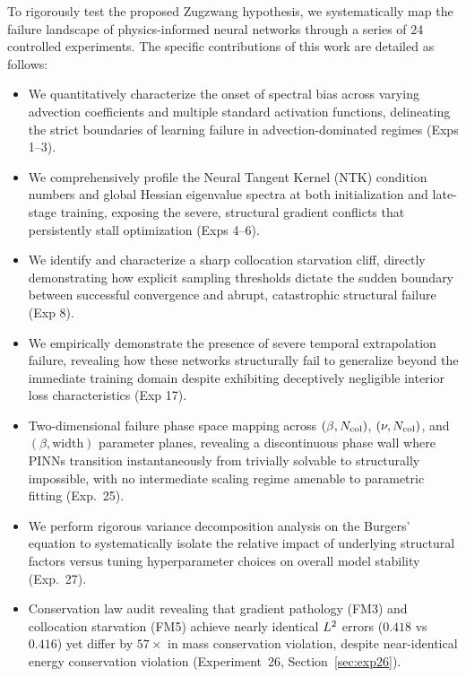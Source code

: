 To rigorously test the proposed Zugzwang hypothesis, we systematically map the failure landscape of physics-informed neural networks through a series of 24 controlled experiments. The specific contributions of this work are detailed as follows:
\begin{itemize}
    \item We quantitatively characterize the onset of spectral bias across varying advection coefficients and multiple standard activation functions, delineating the strict boundaries of learning failure in advection-dominated regimes (Exps 1--3).
    \item We comprehensively profile the Neural Tangent Kernel (NTK) condition numbers and global Hessian eigenvalue spectra at both initialization and late-stage training, exposing the severe, structural gradient conflicts that persistently stall optimization (Exps 4--6).
    \item We identify and characterize a sharp collocation starvation cliff, directly demonstrating how explicit sampling thresholds dictate the sudden boundary between successful convergence and abrupt, catastrophic structural failure (Exp 8).
    \item We empirically demonstrate the presence of severe temporal extrapolation failure, revealing how these networks structurally fail to generalize beyond the immediate training domain despite exhibiting deceptively negligible interior loss characteristics (Exp 17).
    \item Two-dimensional failure phase space mapping across $(\beta, N_{\mathrm{col}}{})$, $(\nu, N_{\mathrm{col}}{})$, and $(\beta, \text{width})$ parameter planes, revealing a discontinuous phase wall where PINNs transition instantaneously from trivially solvable to structurally impossible, with no intermediate scaling regime amenable to parametric fitting (Exp.~25).
    \item We perform rigorous variance decomposition analysis on the Burgers' equation to systematically isolate the relative impact of underlying structural factors versus tuning hyperparameter choices on overall model stability (Exp.~27).
    \item Conservation law audit revealing that gradient pathology (FM3) and collocation starvation (FM5) achieve nearly identical $L^2$ errors ($0.418$ vs $0.416$) yet differ by $57\times$ in mass conservation violation, despite near-identical energy conservation violation (Experiment~26, Section~\ref{sec:exp26}).
\end{itemize}

